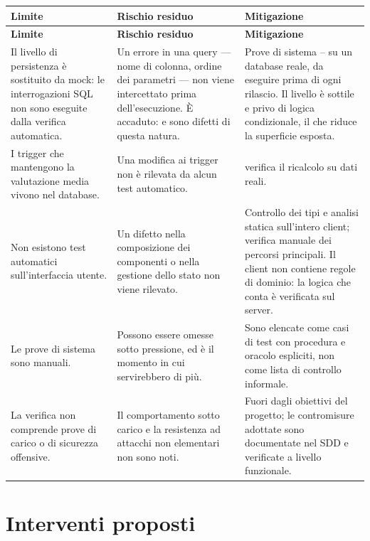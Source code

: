 \begin{longtable}{@{}L{4.4cm} L{5.0cm} L{5.0cm}@{}}
\toprule
\textbf{Limite} & \textbf{Rischio residuo} & \textbf{Mitigazione} \\
\midrule
\endfirsthead
\toprule
\textbf{Limite} & \textbf{Rischio residuo} & \textbf{Mitigazione} \\
\midrule
\endhead
\bottomrule
\endlastfoot

Il livello di persistenza è sostituito da mock: le interrogazioni SQL non
sono eseguite dalla verifica automatica. &
Un errore in una query — nome di colonna, ordine dei parametri — non viene
intercettato prima dell'esecuzione. È accaduto:  e 
sono difetti di questa natura. &
Prove di sistema -- su un database reale, da
eseguire prima di ogni rilascio. Il livello è sottile e privo di logica
condizionale, il che riduce la superficie esposta. \\

I trigger che mantengono la valutazione media vivono nel database. &
Una modifica ai trigger non è rilevata da alcun test automatico. &
 verifica il ricalcolo su dati reali. \\

Non esistono test automatici sull'interfaccia utente. &
Un difetto nella composizione dei componenti o nella gestione dello stato non
viene rilevato. &
Controllo dei tipi e analisi statica sull'intero client; verifica manuale dei
percorsi principali. Il client non contiene regole di dominio: la logica che
conta è verificata sul server. \\

Le prove di sistema sono manuali. &
Possono essere omesse sotto pressione, ed è il momento in cui servirebbero
di più. &
Sono elencate come casi di test con procedura e oracolo espliciti, non come
lista di controllo informale. \\

La verifica non comprende prove di carico o di sicurezza offensive. &
Il comportamento sotto carico e la resistenza ad attacchi non elementari non
sono noti. &
Fuori dagli obiettivi del progetto; le contromisure adottate sono
documentate nel SDD e verificate a livello funzionale. \\

\end{longtable}

\section{Interventi proposti}

